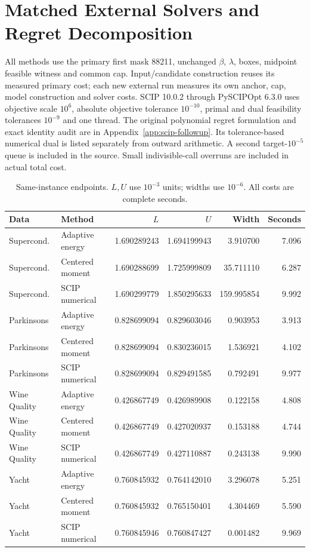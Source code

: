 \section{Matched External Solvers and Regret Decomposition}\label{app:external-v90}
All methods use the primary first mask 88211, unchanged $\beta$, $\lambda$, boxes, midpoint feasible witness and common cap. Input/candidate construction reuses its measured primary cost; each new external run measures its own anchor, cap, model construction and solver costs. SCIP 10.0.2 through PySCIPOpt 6.3.0 uses objective scale $10^6$, absolute objective tolerance $10^{-10}$, primal and dual feasibility tolerances $10^{-9}$ and one thread. The original polynomial regret formulation and exact identity audit are in Appendix~\ref{app:scip-followup}. Its tolerance-based numerical dual is listed separately from outward arithmetic. A second target-$10^{-5}$ queue is included in the source. Small indivisible-call overruns are included in actual total cost.

\begin{table}[t]\centering\small
\caption{Same-instance endpoints. $L,U$ use $10^{-3}$ units; widths use $10^{-6}$. All costs are complete seconds.}
\label{tab:external-endpoints-v90}
\begin{tabular}{llrrrr}\toprule Data&Method&$L$&$U$&Width&Seconds\\\midrule
Supercond. & Adaptive energy & 1.690289243 & 1.694199943 & 3.910700 & 7.096\\
Supercond. & Centered moment & 1.690288699 & 1.725999809 & 35.711110 & 6.287\\
Supercond. & SCIP numerical & 1.690299779 & 1.850295633 & 159.995854 & 9.992\\
Parkinsons & Adaptive energy & 0.828699094 & 0.829603046 & 0.903953 & 3.913\\
Parkinsons & Centered moment & 0.828699094 & 0.830236015 & 1.536921 & 4.102\\
Parkinsons & SCIP numerical & 0.828699094 & 0.829491585 & 0.792491 & 9.977\\
Wine Quality & Adaptive energy & 0.426867749 & 0.426989908 & 0.122158 & 4.808\\
Wine Quality & Centered moment & 0.426867749 & 0.427020937 & 0.153188 & 4.744\\
Wine Quality & SCIP numerical & 0.426867749 & 0.427110887 & 0.243138 & 9.990\\
Yacht & Adaptive energy & 0.760845932 & 0.764142010 & 3.296078 & 5.251\\
Yacht & Centered moment & 0.760845932 & 0.765150401 & 4.304469 & 5.590\\
Yacht & SCIP numerical & 0.760845946 & 0.760847427 & 0.001482 & 9.969\\
\bottomrule\end{tabular}\end{table}
